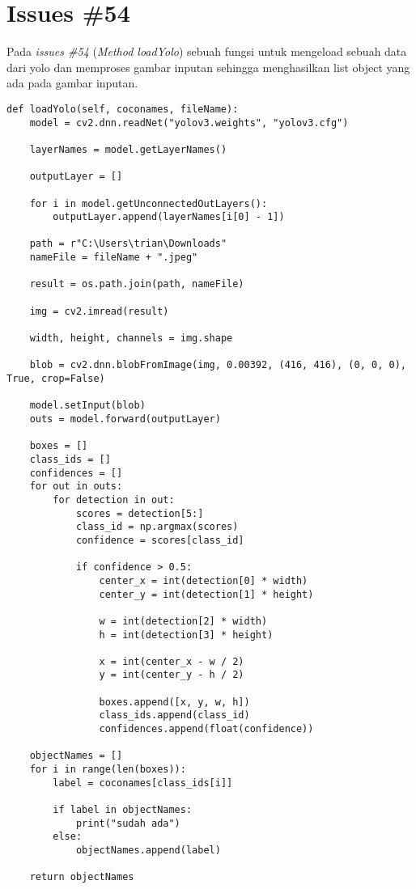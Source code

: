 \section{Issues \#54}
Pada \textit{issues \#54} (\textit{Method loadYolo}) sebuah fungsi untuk mengeload sebuah data dari yolo dan memproses gambar inputan sehingga menghasilkan list object yang ada pada gambar inputan.
\begin{verbatim}
def loadYolo(self, coconames, fileName):
    model = cv2.dnn.readNet("yolov3.weights", "yolov3.cfg")

    layerNames = model.getLayerNames()

    outputLayer = []

    for i in model.getUnconnectedOutLayers():
        outputLayer.append(layerNames[i[0] - 1])

    path = r"C:\Users\trian\Downloads"
    nameFile = fileName + ".jpeg"

    result = os.path.join(path, nameFile)

    img = cv2.imread(result)

    width, height, channels = img.shape

    blob = cv2.dnn.blobFromImage(img, 0.00392, (416, 416), (0, 0, 0), True, crop=False)

    model.setInput(blob)
    outs = model.forward(outputLayer)

    boxes = []
    class_ids = []
    confidences = []
    for out in outs:
        for detection in out:
            scores = detection[5:]
            class_id = np.argmax(scores)
            confidence = scores[class_id]

            if confidence > 0.5:
                center_x = int(detection[0] * width)
                center_y = int(detection[1] * height)

                w = int(detection[2] * width)
                h = int(detection[3] * height)

                x = int(center_x - w / 2)
                y = int(center_y - h / 2)

                boxes.append([x, y, w, h])
                class_ids.append(class_id)
                confidences.append(float(confidence))

    objectNames = []
    for i in range(len(boxes)):
        label = coconames[class_ids[i]]

        if label in objectNames:
            print("sudah ada")
        else:
            objectNames.append(label)

    return objectNames
\end{verbatim}

